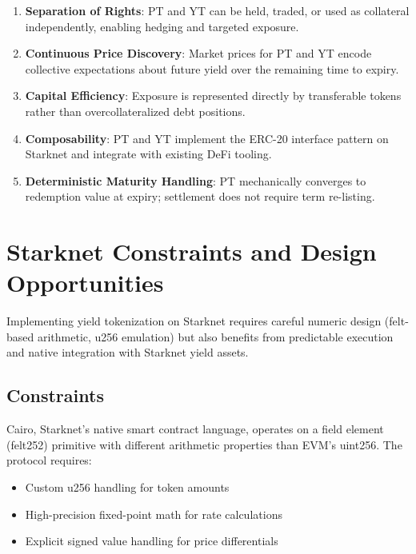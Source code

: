 \begin{enumerate}
    \item \textbf{Separation of Rights}: PT and YT can be held, traded, or used as collateral independently, enabling hedging and targeted exposure.

    \item \textbf{Continuous Price Discovery}: Market prices for PT and YT encode collective expectations about future yield over the remaining time to expiry.

    \item \textbf{Capital Efficiency}: Exposure is represented directly by transferable tokens rather than overcollateralized debt positions.

    \item \textbf{Composability}: PT and YT implement the ERC-20 interface pattern on Starknet and integrate with existing DeFi tooling.

    \item \textbf{Deterministic Maturity Handling}: PT mechanically converges to redemption value at expiry; settlement does not require term re-listing.
\end{enumerate}

\section{Starknet Constraints and Design Opportunities}

Implementing yield tokenization on Starknet requires careful numeric design (felt-based arithmetic, u256 emulation) but also benefits from predictable execution and native integration with Starknet yield assets.

\subsection{Constraints}

Cairo, Starknet's native smart contract language, operates on a field element (felt252) primitive with different arithmetic properties than EVM's uint256. The protocol requires:

\begin{itemize}
    \item Custom u256 handling for token amounts
    \item High-precision fixed-point math for rate calculations
    \item Explicit signed value handling for price differentials
\end{itemize}

